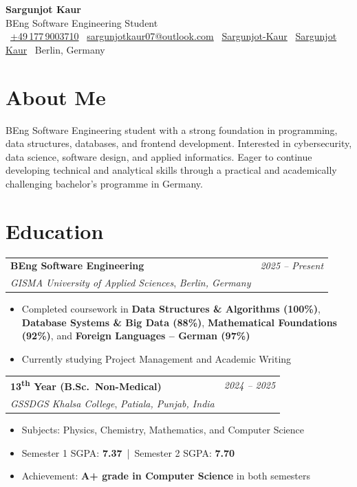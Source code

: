 \documentclass[11pt, a4paper]{article}
\makeatletter
\newcommand{\cventry}[5]{%
  \begin{tabularx}{\linewidth}{@{}X r@{}}
    \textbf{#2} & \textit{\small #1} \\
    \textit{\small #3}, \textit{\small #4} & \\
  \end{tabularx}
  \vspace{2pt}
  #5
  \vspace{6pt}
}
\newenvironment{cvlist}{%
  \begin{itemize}[leftmargin=1.4em, itemsep=1pt, parsep=0pt, topsep=2pt]
}{%
  \end{itemize}
}
\makeatother
\begin{document}
\pagestyle{empty}


\begin{center}
  {\Huge\bfseries Sargunjot Kaur}\\[6pt]
  {\large\color{accent} BEng Software Engineering Student}\\[8pt]
  \small
  \faPhone\ \href{tel:+4917790037 10}{+49\,177\,9003710}\quad
  \faEnvelope\ \href{mailto:sargunjotkaur07@outlook.com}{sargunjotkaur07@outlook.com}\quad
  \faGithub\ \href{https://github.com/Sargunjot-Kaur}{Sargunjot-Kaur}\quad
  \faLinkedin\ \href{https://www.linkedin.com/in/sargunjot-kaur}{Sargunjot Kaur}\quad
  \faMapMarker*\ Berlin, Germany
\end{center}

\vspace{4pt}



\section{About Me}

BEng Software Engineering student with a strong foundation in programming, data structures,
databases, and frontend development. Interested in cybersecurity, data science, software design,
and applied informatics. Eager to continue developing technical and analytical skills through
a practical and academically challenging bachelor's programme in Germany.



\section{Education}

\cventry{2025 -- Present}{BEng Software Engineering}{GISMA University of Applied Sciences}{Berlin, Germany}{%
  \begin{cvlist}
    \item Completed coursework in \textbf{Data Structures \& Algorithms (100\%)},
          \textbf{Database Systems \& Big Data (88\%)},
          \textbf{Mathematical Foundations (92\%)}, and
          \textbf{Foreign Languages -- German (97\%)}
    \item Currently studying Project Management and Academic Writing
  \end{cvlist}
}

\cventry{2024 -- 2025}{13\textsuperscript{th} Year (B.Sc.\ Non-Medical)}{GSSDGS Khalsa College}{Patiala, Punjab, India}{%
  \begin{cvlist}
    \item Subjects: Physics, Chemistry, Mathematics, and Computer Science
    \item Semester 1 SGPA: \textbf{7.37}\ |\ Semester 2 SGPA: \textbf{7.70}
    \item Achievement: \textbf{A+ grade in Computer Science} in both semesters
  \end{cvlist}
}
\end{document}
